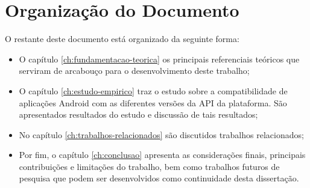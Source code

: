 \section{Organização do Documento} \label{sec:organizacao-trabalho}

O restante deste documento está organizado da seguinte forma:
\begin{itemize}
    \item O capítulo \ref{ch:fundamentacao-teorica} os principais referenciais
    teóricos que serviram de arcabouço para o desenvolvimento deste trabalho;
    \item O capítulo \ref{ch:estudo-empirico}  traz o estudo sobre a compatibilidade
    de aplicações Android com as diferentes versões da API da plataforma. São
    apresentados resultados do estudo e discussão de tais resultados;
    \item No capítulo \ref{ch:trabalhos-relacionados} são discutidos trabalhos
    relacionados;
    \item Por fim, o capítulo \ref{ch:conclusao} apresenta as considerações finais,
    principais contribuições e limitações do trabalho, bem como trabalhos futuros
    de pesquisa que podem ser desenvolvidos como continuidade desta dissertação.
\end{itemize}
